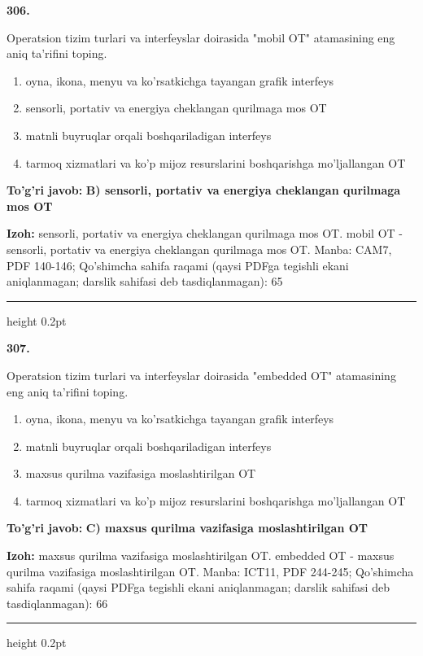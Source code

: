 \documentclass[10pt,a4paper]{article}
\begin{document}
{\bfseries\sffamily\color{ink} 306.}
\par
Operatsion tizim turlari va interfeyslar doirasida "mobil OT" atamasining eng aniq ta'rifini toping.
\begin{enumerate}[label=\Alph*),leftmargin=9mm]
\item oyna, ikona, menyu va ko'rsatkichga tayangan grafik interfeys
\item sensorli, portativ va energiya cheklangan qurilmaga mos OT
\item matnli buyruqlar orqali boshqariladigan interfeys
\item tarmoq xizmatlari va ko'p mijoz resurslarini boshqarishga mo'ljallangan OT
\end{enumerate}
\begin{tcolorbox}[enhanced,breakable,colback=teal!4,colframe=teal!60!black,boxrule=0.45pt,arc=1.2mm,left=2.7mm,right=2.7mm,top=1.8mm,bottom=1.8mm,before skip=2mm,after skip=2mm]
{\bfseries\sffamily\color{teal}To'g'ri javob:} \textbf{B) sensorli, portativ va energiya cheklangan qurilmaga mos OT}
\par\smallskip
{\bfseries Izoh:} sensorli, portativ va energiya cheklangan qurilmaga mos OT. mobil OT - sensorli, portativ va energiya cheklangan qurilmaga mos OT. Manba: CAM7, PDF 140-146; Qo'shimcha sahifa raqami (qaysi PDFga tegishli ekani aniqlanmagan; darslik sahifasi deb tasdiqlanmagan): 65
\end{tcolorbox}
\vspace{2mm}\hrule height 0.2pt\vspace{3mm}

{\bfseries\sffamily\color{ink} 307.}
\par
Operatsion tizim turlari va interfeyslar doirasida "embedded OT" atamasining eng aniq ta'rifini toping.
\begin{enumerate}[label=\Alph*),leftmargin=9mm]
\item oyna, ikona, menyu va ko'rsatkichga tayangan grafik interfeys
\item matnli buyruqlar orqali boshqariladigan interfeys
\item maxsus qurilma vazifasiga moslashtirilgan OT
\item tarmoq xizmatlari va ko'p mijoz resurslarini boshqarishga mo'ljallangan OT
\end{enumerate}
\begin{tcolorbox}[enhanced,breakable,colback=teal!4,colframe=teal!60!black,boxrule=0.45pt,arc=1.2mm,left=2.7mm,right=2.7mm,top=1.8mm,bottom=1.8mm,before skip=2mm,after skip=2mm]
{\bfseries\sffamily\color{teal}To'g'ri javob:} \textbf{C) maxsus qurilma vazifasiga moslashtirilgan OT}
\par\smallskip
{\bfseries Izoh:} maxsus qurilma vazifasiga moslashtirilgan OT. embedded OT - maxsus qurilma vazifasiga moslashtirilgan OT. Manba: ICT11, PDF 244-245; Qo'shimcha sahifa raqami (qaysi PDFga tegishli ekani aniqlanmagan; darslik sahifasi deb tasdiqlanmagan): 66
\end{tcolorbox}
\vspace{2mm}\hrule height 0.2pt\vspace{3mm}
\end{document}
